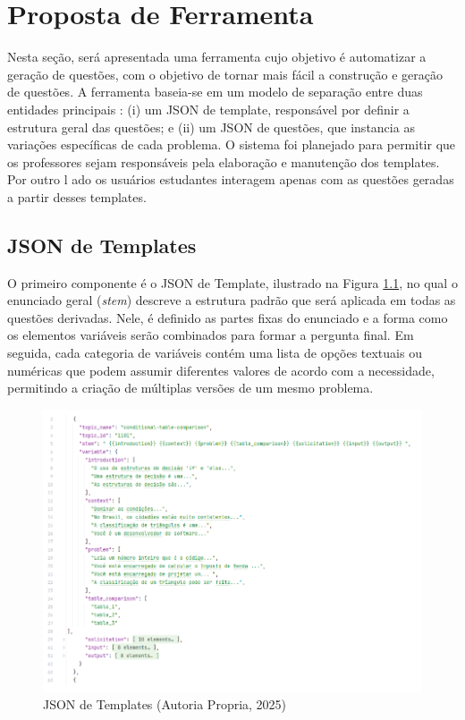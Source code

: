 \chapter{Proposta de Ferramenta}

Nesta seção, será apresentada uma ferramenta cujo objetivo é automatizar a geração de questões, com o objetivo de tornar mais fácil a construção e geração de questões. A ferramenta baseia-se em um modelo de separação entre duas entidades principais : (i) um JSON de template, responsável por definir a estrutura geral das questões; e (ii) um JSON de questões, que instancia as variações específicas de cada problema. O sistema foi planejado para permitir que os professores sejam responsáveis pela elaboração e manutenção dos templates. Por outro l ado os usuários estudantes interagem apenas com as questões geradas a partir desses templates.

\section{JSON de Templates}

O primeiro componente é o JSON de Template, ilustrado na Figura \ref{fig:json-de-templates}, no qual o enunciado geral (\textit{stem}) descreve a estrutura padrão que será aplicada em todas as questões derivadas. Nele, é definido as partes fixas do enunciado e a forma como os elementos variáveis serão combinados para formar a pergunta final. Em seguida, cada categoria de variáveis contém uma lista de opções textuais ou numéricas que podem assumir diferentes valores de acordo com a necessidade, permitindo a criação de múltiplas versões de um mesmo problema.


\begin{figure}[ht]
	\centering
	\includegraphics[width=16cm]{./imagens/capitulo7/json-de-template}
	\caption{JSON de Templates (Autoria Propria, 2025) }
	\label{fig:json-de-templates}
\end{figure}
